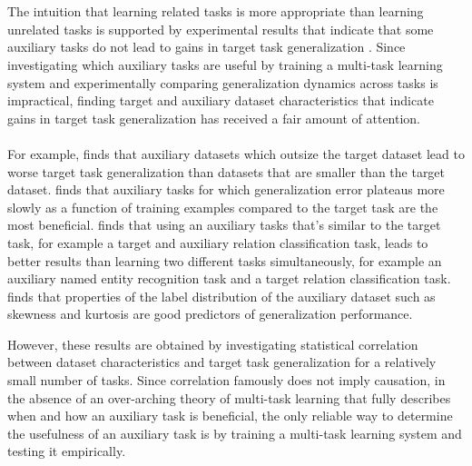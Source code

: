 \\\\
The intuition that learning related tasks is more appropriate than learning unrelated tasks is supported by experimental results that indicate that some auxiliary tasks do not lead to gains in target task generalization \citep{bingel2017, luong2015, mou2016, alonso2016, benton2017}. Since investigating which auxiliary tasks are useful by training a multi-task learning system and experimentally comparing generalization dynamics across tasks is impractical, finding target and auxiliary dataset characteristics that indicate gains in target task generalization has received a fair amount of attention.
\\\\
For example, \citet{luong2015} finds that auxiliary datasets which outsize the target dataset lead to worse target task generalization than datasets that are smaller than the target dataset. \citet{bingel2017} finds that auxiliary tasks for which generalization error plateaus more slowly as a function of training examples compared to the target task are the most beneficial. \citet{mou2016} finds that using an auxiliary tasks that's similar to the target task, for example a target and auxiliary relation classification task, leads to better results than learning two different tasks simultaneously, for example an auxiliary named entity recognition task and a target relation classification task. \citet{alonso2016} finds that properties of the label distribution of the auxiliary dataset such as skewness and kurtosis are good predictors of generalization performance.

However, these results are obtained by investigating statistical correlation between dataset characteristics and target task generalization for a relatively small number of tasks. Since correlation famously does not imply causation, in the absence of an over-arching theory of multi-task learning that fully describes when and how an auxiliary task is beneficial, the only reliable way to determine the usefulness of an auxiliary task is by training a multi-task learning system and testing it empirically.